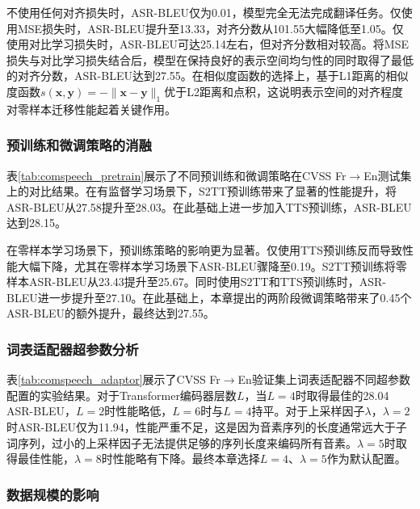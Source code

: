 不使用任何对齐损失时，ASR-BLEU仅为0.01，模型完全无法完成翻译任务。仅使用MSE损失时，ASR-BLEU提升至13.33，对齐分数从101.55大幅降低至1.05。仅使用对比学习损失时，ASR-BLEU可达25.14左右，但对齐分数相对较高。将MSE损失与对比学习损失结合后，模型在保持良好的表示空间均匀性的同时取得了最低的对齐分数，ASR-BLEU达到27.55。在相似度函数的选择上，基于L1距离的相似度函数$s(\mathbf{x}, \mathbf{y}) = -\|\mathbf{x} - \mathbf{y}\|_1$优于L2距离和点积，这说明表示空间的对齐程度对零样本迁移性能起着关键作用。

\subsubsection{预训练和微调策略的消融}



表\ref{tab:comspeech_pretrain}展示了不同预训练和微调策略在CVSS Fr$\rightarrow$En测试集上的对比结果。在有监督学习场景下，S2TT预训练带来了显著的性能提升，将ASR-BLEU从27.58提升至28.03。在此基础上进一步加入TTS预训练，ASR-BLEU达到28.15。

在零样本学习场景下，预训练策略的影响更为显著。仅使用TTS预训练反而导致性能大幅下降，尤其在零样本学习场景下ASR-BLEU骤降至0.19。S2TT预训练将零样本ASR-BLEU从23.43提升至25.67。同时使用S2TT和TTS预训练时，ASR-BLEU进一步提升至27.10。在此基础上，本章提出的两阶段微调策略带来了0.45个ASR-BLEU的额外提升，最终达到27.55。

\subsubsection{词表适配器超参数分析}



表\ref{tab:comspeech_adaptor}展示了CVSS Fr$\rightarrow$En验证集上词表适配器不同超参数配置的实验结果。对于Transformer编码器层数$L$，当$L=4$时取得最佳的28.04 ASR-BLEU，$L=2$时性能略低，$L=6$时与$L=4$持平。对于上采样因子$\lambda$，$\lambda=2$时ASR-BLEU仅为11.94，性能严重不足，这是因为音素序列的长度通常远大于子词序列，过小的上采样因子无法提供足够的序列长度来编码所有音素。$\lambda=5$时取得最佳性能，$\lambda=8$时性能略有下降。最终本章选择$L=4$、$\lambda=5$作为默认配置。

\subsubsection{数据规模的影响}

